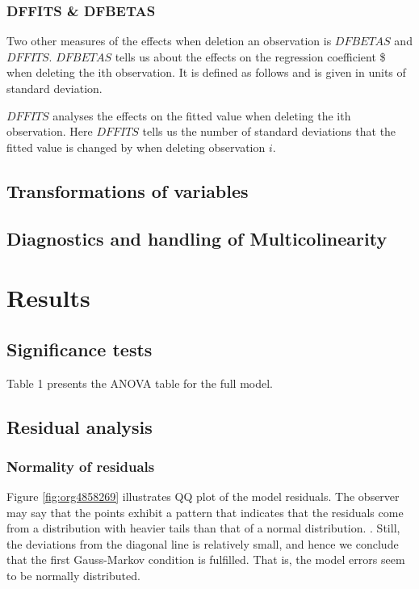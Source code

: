 \documentclass[11pt]{article}
\begin{document}
\subsubsection{DFFITS \& DFBETAS}
\label{sec:orgd173ba0}

Two other measures of the effects when deletion an observation is \(DFBETAS\) and \(DFFITS\). \(DFBETAS\) tells us
about the effects on the regression coefficient \$ when deleting the ith observation. It is defined as
follows and is given in units of standard deviation.

\(DFFITS\) analyses the effects on the fitted value when deleting the ith observation. Here \(DFFITS\) tells us
the number of standard deviations that the fitted value is changed by when deleting observation \(i\).

\subsection{Transformations of variables}
\label{sec:org66d44c0}
\subsection{Diagnostics and handling of Multicolinearity}
\label{sec:org6f789fc}
\newpage
\section{Results}
\label{sec:org59609e5}
\subsection{Significance tests}
\label{sec:org3663f5e}

Table 1 presents the ANOVA table for the full model. 



\subsection{Residual analysis}
\label{sec:org5fd9edd}
\subsubsection{Normality of residuals}
\label{sec:orgd86c7ca}

Figure \ref{fig:org4858269} illustrates QQ plot of the model residuals. The observer may say that the 
points exhibit a pattern that indicates that the residuals come from a distribution with heavier tails
than that of a normal distribution. 
\cite{Montgomery2012}. Still, the deviations from the diagonal line is relatively small, and hence
we conclude that the first Gauss-Markov condition is fulfilled. That is, the model errors seem to be 
normally distributed.
\end{document}
